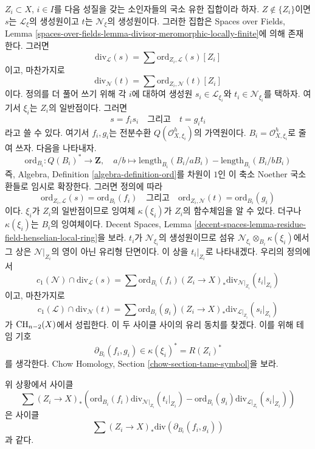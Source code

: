 \medskip\noindent
$Z_i \subset X$, $i \in I$를 다음 성질을 갖는 소인자들의 국소 유한
집합이라 하자. $Z \not \in \{Z_i\}$이면 $s$는
$\mathcal{L}_\xi$의 생성원이고 $t$는 $\mathcal{N}_\xi$의 생성원이다.
그러한 집합은 Spaces over Fields, Lemma
\ref{spaces-over-fields-lemma-divisor-meromorphic-locally-finite}에
의해 존재한다. 그러면
$$
\text{div}_\mathcal{L}(s) = \sum \text{ord}_{Z_i, \mathcal{L}}(s) [Z_i]
$$
이고, 마찬가지로
$$
\text{div}_\mathcal{N}(t) = \sum \text{ord}_{Z_i, \mathcal{N}}(t) [Z_i]
$$
이다. 정의를 더 풀어 쓰기 위해 각 $i$에 대하여 생성원
$s_i \in \mathcal{L}_{\xi_i}$와 $t_i \in \mathcal{N}_{\xi_i}$를
택하자. 여기서 $\xi_i$는 $Z_i$의 일반점이다. 그러면
$$
s = f_i s_i
\quad\text{그리고}\quad
t = g_i t_i
$$
라고 쓸 수 있다. 여기서 $f_i, g_i$는 전분수환
$Q(\mathcal{O}_{X, \xi_i}^h)$의 가역원이다.
$B_i = \mathcal{O}_{X, \xi_i}^h$로 줄여 쓰자. 다음을 나타내자.
$$
\text{ord}_{B_i} : Q(B_i)^* \longrightarrow \mathbf{Z},\quad
a/b \longmapsto
\text{length}_{B_i}(B_i/aB_i) - \text{length}_{B_i}(B_i/bB_i)
$$
즉, Algebra, Definition \ref{algebra-definition-ord}를 차원이 $1$인 이
축소 Noether 국소환들로 임시로 확장한다. 그러면 정의에 따라
$$
\text{ord}_{Z_i, \mathcal{L}}(s) = \text{ord}_{B_i}(f_i)
\quad\text{그리고}\quad
\text{ord}_{Z_i, \mathcal{N}}(t) = \text{ord}_{B_i}(g_i)
$$
이다. $\xi_i$가 $Z_i$의 일반점이므로 잉여체 $\kappa(\xi_i)$가
$Z_i$의 함수체임을 알 수 있다. 더구나 $\kappa(\xi_i)$는
$B_i$의 잉여체이다. Decent Spaces, Lemma
\ref{decent-spaces-lemma-residue-field-henselian-local-ring}을 보라.
$t_i$가 $\mathcal{N}_{\xi_i}$의 생성원이므로 섬유
$\mathcal{N}_{\xi_i} \otimes_{B_i} \kappa(\xi_i)$에서 그 상은
$\mathcal{N}|_{Z_i}$의 영이 아닌 유리형 단면이다. 이 상을
$t_i|_{Z_i}$로 나타내겠다. 우리의 정의에서
$$
c_1(\mathcal{N}) \cap \text{div}_\mathcal{L}(s) =
\sum \text{ord}_{B_i}(f_i)
(Z_i \to X)_*\text{div}_{\mathcal{N}|_{Z_i}}(t_i|_{Z_i})
$$
이고, 마찬가지로
$$
c_1(\mathcal{L}) \cap \text{div}_\mathcal{N}(t) =
\sum \text{ord}_{B_i}(g_i)
(Z_i \to X)_*\text{div}_{\mathcal{L}|_{Z_i}}(s_i|_{Z_i})
$$
가 $\mathop{\mathrm{CH}}\nolimits_{n - 2}(X)$에서 성립한다. 이 두 사이클 사이의 유리 동치를
찾겠다. 이를 위해 테임 기호
$$
\partial_{B_i}(f_i, g_i) \in \kappa(\xi_i)^* = R(Z_i)^*
$$
를 생각한다. Chow Homology, Section
\ref{chow-section-tame-symbol}을 보라.

\begin{lemma}[핵심 공식]
\label{lemma-key-formula}
위 상황에서 사이클
$$
\sum
(Z_i \to X)_*\left(
\text{ord}_{B_i}(f_i) \text{div}_{\mathcal{N}|_{Z_i}}(t_i|_{Z_i}) -
\text{ord}_{B_i}(g_i) \text{div}_{\mathcal{L}|_{Z_i}}(s_i|_{Z_i}) \right)
$$
은 사이클
$$
\sum (Z_i \to X)_*\text{div}(\partial_{B_i}(f_i, g_i))
$$
과 같다.
\end{lemma}

